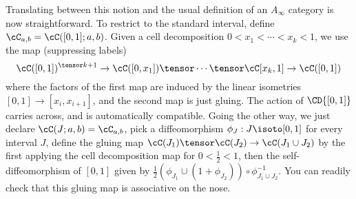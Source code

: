 Translating between this notion and the usual definition of an $A_\infty$ category is now straightforward. To restrict to the standard interval, define $\cC_{a,b} = \cC([0,1];a,b)$. Given a cell decomposition $0 < x_1< \cdots < x_k < 1$, we use the map (suppressing labels)
$$\cC([0,1])^{\tensor k+1} \to \cC([0,x_1]) \tensor \cdots \tensor \cC[x_k,1] \to \cC([0,1])$$
where the factors of the first map are induced by the linear isometries $[0,1] \to [x_i, x_{i+1}]$, and the second map is just gluing. The action of $\CD{[0,1]}$ carries across, and is automatically compatible. Going the other way, we just declare $\cC(J;a,b) = \cC_{a,b}$, pick a diffeomorphism $\phi_J : J \isoto [0,1]$ for every interval $J$, define the gluing map $\cC(J_1) \tensor \cC(J_2) \to \cC(J_1 \cup J_2)$ by the first applying the cell decomposition map for $0 < \frac{1}{2} < 1$, then the self-diffeomorphism of $[0,1]$ given by $\frac{1}{2} (\phi_{J_1} \cup (1+ \phi_{J_2})) \circ \phi_{J_1 \cup J_2}^{-1}$. You can readily check that this gluing map is associative on the nose. 





